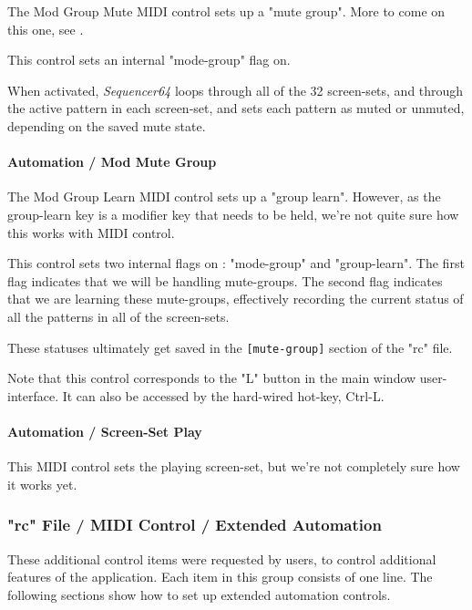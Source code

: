    The Mod Group Mute MIDI control sets up a "mute group".
   More to come on this one,
   see .

   This control sets an internal "mode-group" flag on.

   When activated, \textsl{Sequencer64} loops through all of the 32
   screen-sets, and through the active pattern in each screen-set, and
   sets each pattern as muted or unmuted, depending on the saved mute state.

\paragraph{Automation / Mod Mute Group}
\label{paragraph:seq64_rc_file_midi_ctrl_modgmute}

   The Mod Group Learn MIDI control sets up a "group learn".
   However, as the group-learn key is a modifier key that needs to
   be held, we're not quite sure how this works with MIDI control.

   This control sets two internal flags on : "mode-group" and "group-learn".
   The first flag indicates that we will be handling mute-groups.
   The second flag indicates that we are learning these mute-groups,
   effectively recording the current status of all the patterns in all of the
   screen-sets.

   These statuses ultimately get saved in the \texttt{[mute-group]} section of
   the "rc" file.

   Note that this control corresponds to the "L" button in the main window
   user-interface.
   It can also be accessed by the hard-wired hot-key, Ctrl-L.

\paragraph{Automation / Screen-Set Play}
\label{paragraph:seq64_rc_file_midi_ctrl_ssplay}

This MIDI control sets the playing screen-set, 
but we're not completely sure how it works yet.

\subsubsection{"rc" File / MIDI Control / Extended Automation}
\label{subsubsec:seq64_rc_file_midi_ctrl_automationex}

   These additional control items were requested by users, to control
   additional features of the application.
   Each item in this group consists of one line.
   The following sections show how to set up extended automation controls.

